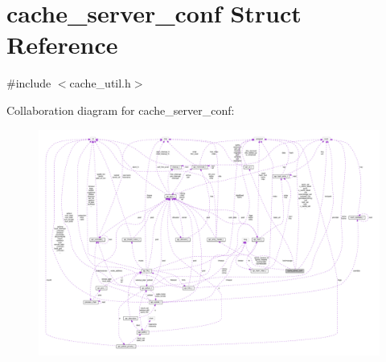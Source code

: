\hypertarget{structcache__server__conf}{}\section{cache\+\_\+server\+\_\+conf Struct Reference}
\label{structcache__server__conf}


{\ttfamily \#include $<$cache\+\_\+util.\+h$>$}



Collaboration diagram for cache\+\_\+server\+\_\+conf\+:
\nopagebreak
\begin{figure}[H]
\begin{center}
\leavevmode
\includegraphics[width=350pt]{structcache__server__conf__coll__graph}
\end{center}
\end{figure}
